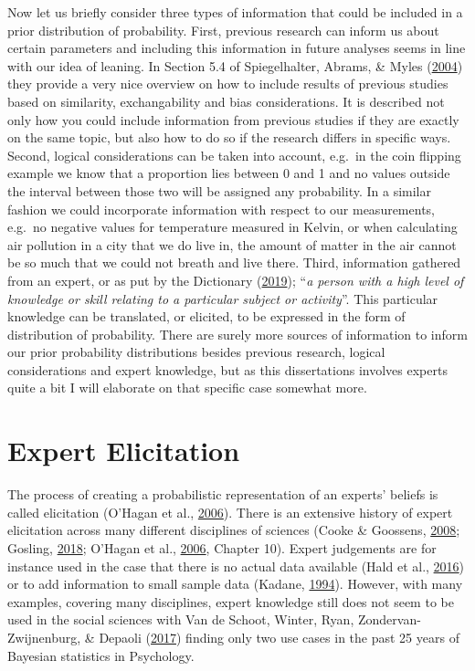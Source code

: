 \documentclass[openright,titlepage,12pt,a4paper]{book}
\begin{document}
Now let us briefly consider three types of information that could be included in a prior distribution of probability. First, previous research can inform us about certain parameters and including this information in future analyses seems in line with our idea of leaning. In Section 5.4 of Spiegelhalter, Abrams, \& Myles (\protect\hyperlink{ref-spiegelhalter_bayesian_2004}{2004}) they provide a very nice overview on how to include results of previous studies based on similarity, exchangability and bias considerations. It is described not only how you could include information from previous studies if they are exactly on the same topic, but also how to do so if the research differs in specific ways. Second, logical considerations can be taken into account, e.g.~in the coin flipping example we know that a proportion lies between 0 and 1 and no values outside the interval between those two will be assigned any probability. In a similar fashion we could incorporate information with respect to our measurements, e.g.~no negative values for temperature measured in Kelvin, or when calculating air pollution in a city that we do live in, the amount of matter in the air cannot be so much that we could not breath and live there. Third,
information gathered from an expert, or as put by the Dictionary (\protect\hyperlink{ref-cambridge_english_dictionary_expert_2019}{2019}); ``\emph{a person with a high level of knowledge or skill relating to a particular subject or activity}''. This particular knowledge can be translated, or elicited, to be expressed in the form of distribution of probability. There are surely more sources of information to inform our prior probability distributions besides previous research, logical considerations and expert knowledge, but as this dissertations involves experts quite a bit I will elaborate on that specific case somewhat more.

\hypertarget{expert-elicitation}{%
\section{Expert Elicitation}\label{expert-elicitation}}

The process of creating a probabilistic representation of an experts' beliefs is called elicitation (O'Hagan et al., \protect\hyperlink{ref-ohagan_uncertain_2006}{2006}). There is an extensive history of expert elicitation across many different disciplines of sciences (Cooke \& Goossens, \protect\hyperlink{ref-cooke_tu_2008}{2008}; Gosling, \protect\hyperlink{ref-gosling_shelf:_2018}{2018}; O'Hagan et al., \protect\hyperlink{ref-ohagan_uncertain_2006}{2006}, Chapter 10). Expert judgements are for instance used in the case that there is no actual data available (Hald et al., \protect\hyperlink{ref-hald_world_2016}{2016}) or to add information to small sample data (Kadane, \protect\hyperlink{ref-kadane_application_1994}{1994}). However, with many examples, covering many disciplines, expert knowledge still does not seem to be used in the social sciences with Van de Schoot, Winter, Ryan, Zondervan-Zwijnenburg, \& Depaoli (\protect\hyperlink{ref-van_de_schoot_systematic_2017}{2017}) finding only two use cases in the past 25 years of Bayesian statistics in Psychology.
\end{document}
